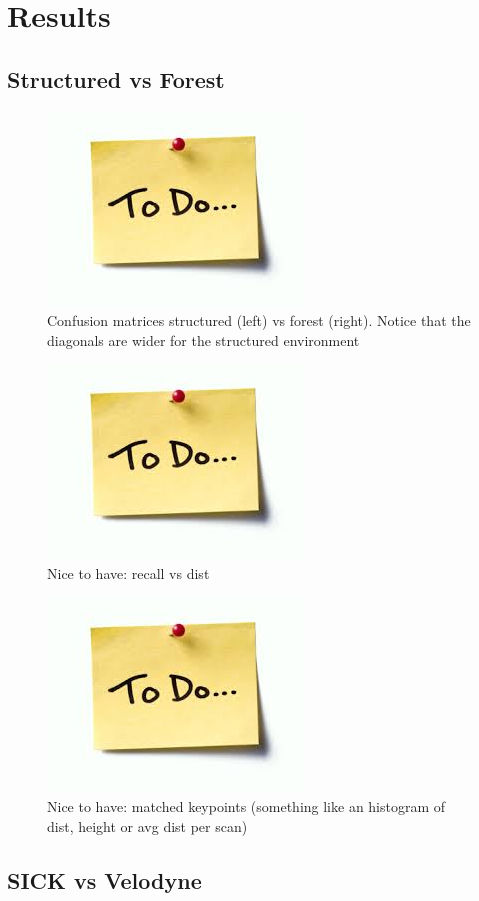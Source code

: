 \section{Results}
\label{sec:chap_slam_results}


\subsection{Structured vs Forest}
\label{ssec:chap_slam_struct_vs_forest}

\begin{figure}[htpb]
    \centering
    \includegraphics[width=0.2\linewidth]{img/todo.jpg}
    \caption{Confusion matrices structured (left) vs forest (right). Notice that the diagonals are wider for the structured environment}
    \label{fig:matrices_struct_vs_forest}
\end{figure}

\begin{figure}[htpb]
    \centering
    \includegraphics[width=0.2\linewidth]{img/todo.jpg}
    \caption{Nice to have: recall vs dist}
    \label{fig:recall_dist}
\end{figure}

\begin{figure}[htpb]
    \centering
    \includegraphics[width=0.2\linewidth]{img/todo.jpg}
    \caption{Nice to have: matched keypoints (something like an histogram of dist, height or avg dist per scan)}
    \label{fig:match_avg_dist}
\end{figure}

\subsection{SICK vs Velodyne}
\label{ssec:chap_slam_sick_vs_velodyne}
